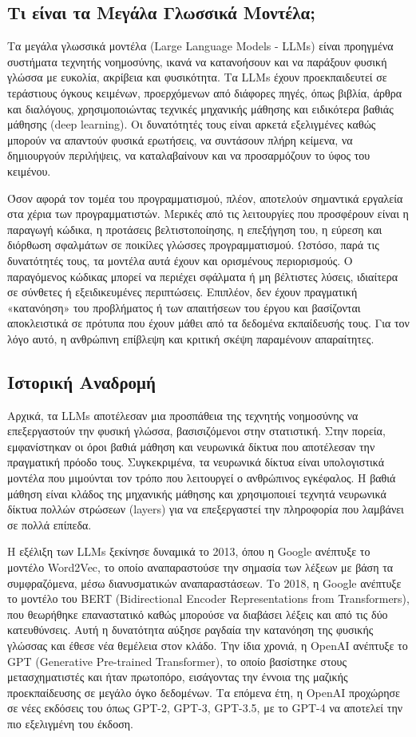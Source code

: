 \subsection{Τι είναι τα Μεγάλα Γλωσσικά Μοντέλα;}
Τα μεγάλα γλωσσικά μοντέλα (Large Language Models - LLMs) είναι προηγμένα συστήματα τεχνητής νοημοσύνης, ικανά να κατανοήσουν και να παράξουν φυσική γλώσσα με ευκολία, ακρίβεια και φυσικότητα. Τα LLMs έχουν προεκπαιδευτεί σε τεράστιους όγκους κειμένων, προερχόμενων από διάφορες πηγές, όπως βιβλία, άρθρα και διαλόγους, χρησιμοποιώντας τεχνικές μηχανικής μάθησης και ειδικότερα βαθιάς μάθησης (deep learning). Οι δυνατότητές τους είναι αρκετά εξελιγμένες καθώς μπορούν να απαντούν φυσικά ερωτήσεις, να συντάσουν πλήρη κείμενα, να δημιουργούν περιλήψεις, να καταλαβαίνουν και να προσαρμόζουν το ύφος του κειμένου. 

Όσον αφορά τον τομέα του προγραμματισμού, πλέον, αποτελούν σημαντικά εργαλεία στα χέρια των προγραμματιστών. Μερικές από τις λειτουργίες που προσφέρουν είναι η παραγωγή κώδικα, η προτάσεις βελτιστοποίησης, η επεξήγηση του, η εύρεση και διόρθωση σφαλμάτων σε ποικίλες γλώσσες προγραμματισμού. Ωστόσο, παρά τις δυνατότητές τους, τα μοντέλα αυτά έχουν και ορισμένους περιορισμούς. Ο παραγόμενος κώδικας μπορεί να περιέχει σφάλματα ή μη βέλτιστες λύσεις, ιδιαίτερα σε σύνθετες ή εξειδικευμένες περιπτώσεις. Επιπλέον, δεν έχουν πραγματική «κατανόηση» του προβλήματος ή των απαιτήσεων του έργου και βασίζονται αποκλειστικά σε πρότυπα που έχουν μάθει από τα δεδομένα εκπαίδευσής τους. Για τον λόγο αυτό, η ανθρώπινη επίβλεψη και κριτική σκέψη παραμένουν απαραίτητες.

\subsection{Ιστορική Αναδρομή}
Αρχικά, τα LLMs αποτέλεσαν μια προσπάθεια της τεχνητής νοημοσύνης να επεξεργαστούν την φυσική γλώσσα, βασισιζόμενοι στην στατιστική. Στην πορεία, εμφανίστηκαν οι όροι βαθιά μάθηση και νευρωνικά δίκτυα που αποτέλεσαν την πραγματική πρόοδο τους. Συγκεκριμένα, τα νευρωνικά δίκτυα είναι υπολογιστικά μοντέλα που μιμούνται τον τρόπο που λειτουργεί ο ανθρώπινος εγκέφαλος. Η βαθιά μάθηση είναι κλάδος της μηχανικής μάθησης και χρησιμοποιεί τεχνητά νευρωνικά δίκτυα πολλών στρώσεων (layers) για να επεξεργαστεί την πληροφορία που λαμβάνει σε πολλά επίπεδα.

Η εξέλιξη των LLMs ξεκίνησε δυναμικά το 2013, όπου η Google ανέπτυξε το μοντέλο Word2Vec, το οποίο αναπαραστούσε την σημασία των λέξεων με βάση τα συμφραζόμενα, μέσω διανυσματικών αναπαραστάσεων. Το 2018, η Google ανέπτυξε το μοντέλο του BERT (Bidirectional Encoder Representations from Transformers), που θεωρήθηκε επαναστατικό καθώς μπορούσε να διαβάσει λέξεις και από τις δύο κατευθύνσεις. Αυτή η δυνατότητα αύξησε ραγδαία την κατανόηση της φυσικής γλώσσας και έθεσε νέα θεμέλεια στον κλάδο. Την ίδια χρονιά, η OpenAI ανέπτυξε το GPT (Generative Pre-trained Transformer), το οποίο βασίστηκε στους μετασχηματιστές  και ήταν πρωτοπόρο, εισάγοντας την έννοια της μαζικής προεκπαίδευσης σε μεγάλο όγκο δεδομένων. Τα επόμενα έτη, η OpenAI προχώρησε σε νέες εκδόσεις του όπως GPT-2, GPT-3, GPT-3.5, με το GPT-4 να αποτελεί την πιο εξελιγμένη του έκδοση.


